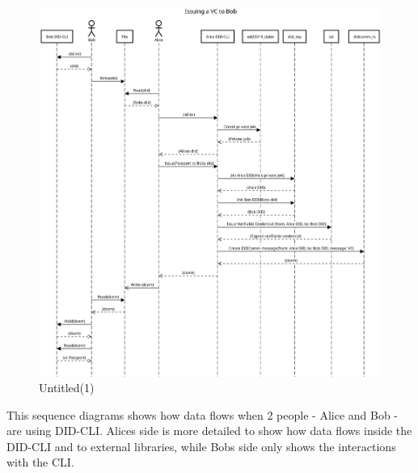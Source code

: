 \begin{figure}
\centering
\includegraphics{Architecture 1442df162dbe45f4a423ba37d3e12363/Untitled(1)}
\caption{Untitled(1)}
\end{figure}

This sequence diagrams shows how data flows when 2 people - Alice and
Bob - are using DID-CLI. Alices side is more detailed to show how data
flows inside the DID-CLI and to external libraries, while Bobs side only
shows the interactions with the CLI.

